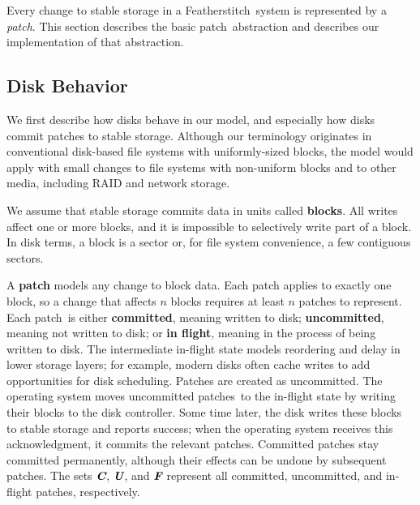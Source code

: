 \documentclass[9pt,twocolumn,letterpaper]{article}
\newcommand{\Kudos}{Featherstitch}
\newcommand{\patch}{patch}
\newcommand{\patches}{patches}
\begin{document}
Every change to stable storage in a \Kudos\ system is represented by a
\emph{\patch}.
%
This section describes the basic \patch\ abstraction
 and describes our implementation of that abstraction.

\begin{comment}
%
%
Each \patch\ $p$ encapsulates four important pieces of information: its
 \emph{block}, its \emph{state}, a set of \emph{direct dependencies}, and
 some \emph{undo data}.
\end{comment}

\subsection{Disk Behavior}

We first describe how disks behave in our model, and
 especially how disks commit patches to stable storage.
%
Although our terminology originates in conventional disk-based file systems
 with uniformly-sized blocks, the model would apply with small changes to
 file systems with non-uniform blocks and to other media, including RAID
 and network storage.

We assume that stable storage commits data in units called
 \textbf{blocks}.
%
All writes affect one or more blocks, and it is impossible to selectively
 write part of a block.
%
In disk terms, a block is a sector or, for file system convenience,
 a few contiguous sectors.

A \textbf{patch} models any change to block data.
%
Each patch applies to exactly one block, so a change that
 affects $n$ blocks requires at least $n$ patches to represent.
%
Each \patch\ is either
 \textbf{committed}, meaning written to disk;
 \textbf{uncommitted}, meaning not written to disk;
 or \textbf{in flight}, meaning in the process of being written to disk.
%
The intermediate in-flight state models reordering and delay in
 lower storage layers; for example, modern disks often cache
 writes to add opportunities for disk scheduling.
%
Patches are created as uncommitted.
%
The operating system moves uncommitted \patches\ to the in-flight state
 by writing their blocks to the disk controller.  Some
 time later, the disk writes these blocks
 to stable storage and reports success; when the operating system receives this
 acknowledgment, it commits the relevant patches.
%
Committed patches stay committed permanently, although their effects can
 be undone by subsequent patches.
%
The sets $\PDisk$, $\PMem$, and $\PInf$ represent all committed,
 uncommitted, and in-flight patches, respectively.
%
%
\end{document}

